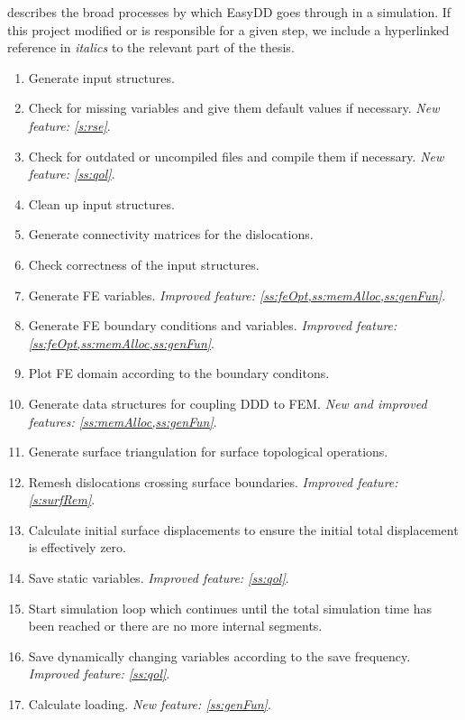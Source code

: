  describes the broad processes by which EasyDD goes through in a simulation. If this project modified or is responsible for a given step, we include a hyperlinked reference in \emph{italics} to the relevant part of the thesis.
\begin{center}
  \label{alg:EasyDD}
  \begin{enumerate}
    \item Generate input structures.
    \item Check for missing variables and give them default values if necessary. \emph{New feature: \cref{s:rse}}.
    \item Check for outdated or uncompiled files and compile them if necessary. \emph{New feature: \cref{ss:qol}}.
    \item Clean up input structures.
    \item Generate connectivity matrices for the dislocations.
    \item Check correctness of the input structures.
    \item Generate FE variables. \emph{Improved feature: \cref{ss:feOpt,ss:memAlloc,ss:genFun}}.
    \item Generate FE boundary conditions and variables. \emph{Improved feature: \cref{ss:feOpt,ss:memAlloc,ss:genFun}}.
    \item Plot FE domain according to the boundary conditons.
    \item Generate data structures for coupling DDD to FEM. \emph{New and improved features: \cref{ss:memAlloc,ss:genFun}}.
    \item Generate surface triangulation for surface topological operations.
    \item Remesh dislocations crossing surface boundaries. \emph{Improved feature: \cref{s:surfRem}}.
    \item Calculate initial surface displacements to ensure the initial total displacement is effectively zero.
    \item Save static variables. \emph{Improved feature: \cref{ss:qol}}.
    \item Start simulation loop which continues until the total simulation time has been reached or there are no more internal segments.
    \item Save dynamically changing variables according to the save frequency. \emph{Improved feature: \cref{ss:qol}}.
    \item Calculate loading. \emph{New feature: \cref{ss:genFun}}.

\end{enumerate}
\end{center}
